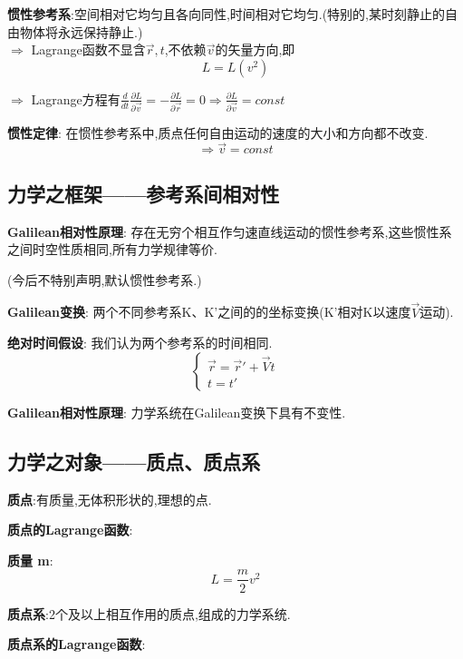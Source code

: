 \documentclass{article}
\begin{document}
        \textbf{惯性参考系}:空间相对它均匀且各向同性,时间相对它均匀.(特别的,某时刻静止的自由物体将永远保持静止.)\\
        $\Rightarrow$ Lagrange函数不显含$\vec r,t$,不依赖$\vec v$的矢量方向,即
            $$L = L(v^2)$$
        
        $\Rightarrow$ Lagrange方程有$\frac{d}{dt}\frac{\partial L}{\partial \vec v} = -\frac{\partial L}{\partial \vec r} = 0 \Rightarrow \frac{\partial L}{\partial \vec v}=const$
        
        \textbf{惯性定律}: 在惯性参考系中,质点任何自由运动的速度的大小和方向都不改变.
            $$\Rightarrow \vec v = const$$


    \subsection{力学之框架——参考系间相对性}
        \textbf{Galilean相对性原理}: 存在无穷个相互作匀速直线运动的惯性参考系,这些惯性系之间时空性质相同,所有力学规律等价.
        
        (今后不特别声明,默认惯性参考系.)
        
        \textbf{Galilean变换}: 两个不同参考系K、K'之间的的坐标变换(K'相对K以速度$\vec V$运动).
        
        \textbf{绝对时间假设}: 我们认为两个参考系的时间相同.
            \begin{displaymath}
                \left\{ \begin{array}{ll}
                \vec r = \vec r' + \vec V t\\
                t = t'
                \end{array} \right.
            \end{displaymath}
        
        \textbf{Galilean相对性原理}: 力学系统在Galilean变换下具有不变性.
    
    
    \subsection{力学之对象——质点、质点系}
        \textbf{质点}:有质量,无体积形状的,理想的点.
        
        \textbf{质点的Lagrange函数}:
        
        \textbf{质量 m}:
            $$L = \frac{m}{2} v^2$$
        
        \textbf{质点系}:2个及以上相互作用的质点,组成的力学系统.
        
        \textbf{质点系的Lagrange函数}:
        
\end{document}
